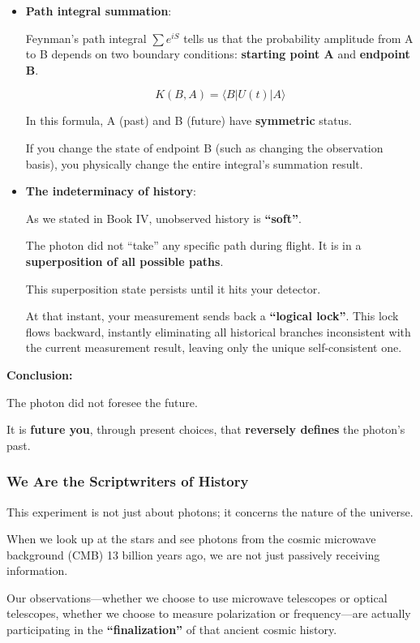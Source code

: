 \begin{itemize}
\item \textbf{Path integral summation}:

Feynman's path integral $\sum e^{iS}$ tells us that the probability amplitude from A to B depends on two boundary conditions: \textbf{starting point A} and \textbf{endpoint B}.

\[K(B, A) = \langle B | U(t) | A \rangle\]

In this formula, A (past) and B (future) have \textbf{symmetric} status.

If you change the state of endpoint B (such as changing the observation basis), you physically change the entire integral's summation result.

\item \textbf{The indeterminacy of history}:

As we stated in Book IV, unobserved history is \textbf{``soft''}.

The photon did not ``take'' any specific path during flight. It is in a \textbf{superposition of all possible paths}.

This superposition state persists until it hits your detector.

At that instant, your measurement sends back a \textbf{``logical lock''}. This lock flows backward, instantly eliminating all historical branches inconsistent with the current measurement result, leaving only the unique self-consistent one.
\end{itemize}

\textbf{Conclusion:}

The photon did not foresee the future.

It is \textbf{future you}, through present choices, that \textbf{reversely defines} the photon's past.

\subsubsection{We Are the Scriptwriters of History}

This experiment is not just about photons; it concerns the nature of the universe.

When we look up at the stars and see photons from the cosmic microwave background (CMB) 13 billion years ago, we are not just passively receiving information.

Our observations---whether we choose to use microwave telescopes or optical telescopes, whether we choose to measure polarization or frequency---are actually participating in the \textbf{``finalization''} of that ancient cosmic history.


